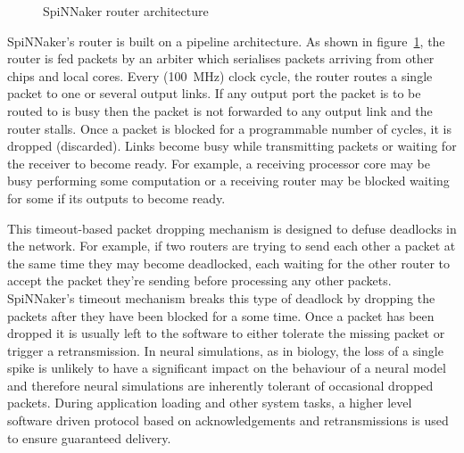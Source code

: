 			\begin{figure}
				\center
				
				\caption{SpiNNaker router architecture}
				\label{fig:router-architecture}
			\end{figure}
			
			SpiNNaker's router is built on a pipeline architecture. As shown in
			figure~\ref{fig:router-architecture}, the router is fed packets by an
			arbiter which serialises packets arriving from other chips and local
			cores. Every (\SI{100}{\mega\hertz}) clock cycle, the router routes a
			single packet to one or several output links. If any output port the
			packet is to be routed to is busy then the packet is not forwarded to any
			output link and the router stalls. Once a packet is blocked for a
			programmable number of cycles, it is dropped (discarded). Links become
			busy while transmitting packets or waiting for the receiver to become
			ready. For example, a receiving processor core may be busy performing
			some computation or a receiving router may be blocked waiting for some if
			its outputs to become ready.
			
			This timeout-based packet dropping mechanism is designed to defuse
			deadlocks in the network. For example, if two routers are trying to send
			each other a packet at the same time they may become deadlocked, each
			waiting for the other router to accept the packet they're sending before
			processing any other packets. SpiNNaker's timeout mechanism breaks this
			type of deadlock by dropping the packets after they have been blocked for
			a some time. Once a packet has been dropped it is usually left to the
			software to either tolerate the missing packet or trigger a
			retransmission. In neural simulations, as in biology, the loss of a
			single spike is unlikely to have a significant impact on the behaviour of
			a neural model and therefore neural simulations are inherently tolerant
			of occasional dropped packets. During application loading and other
			system tasks, a higher level software driven protocol based on
			acknowledgements and retransmissions is used to ensure guaranteed
			delivery.
			
	
